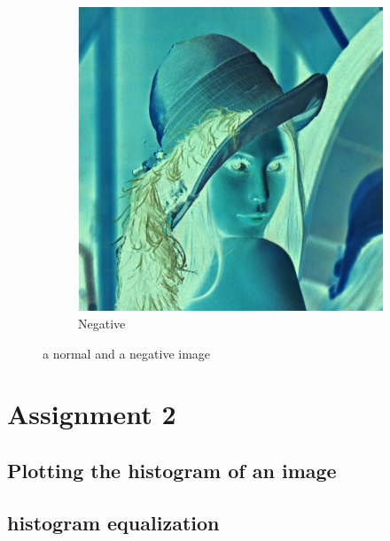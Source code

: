 \documentclass[a4paper,16pt]{article}
\begin{document}
\begin{figure}[h!]
\begin{subfigure}[h]{0.4\linewidth}
			\includegraphics[width=\linewidth]{negative}
			\caption{Negative}
		\end{subfigure}%
		\caption{a normal and a negative image}
	\end{figure}
	\newpage
	\section{Assignment 2}
	\vspace{0.2in}
	\subsection{Plotting the histogram of an image}
	\subsection{histogram equalization}
	
\end{document}
